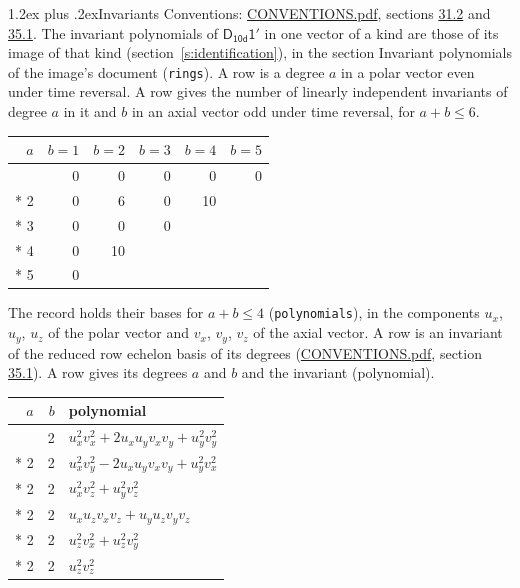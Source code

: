 \documentclass[10pt,a4paper]{article}
\makeatletter
\renewcommand\section{\@startsection{section}{1}{\z@}{-3ex plus -1ex minus -.2ex}%
  {1.2ex plus .2ex}{\normalfont\large\sffamily\bfseries\color{parttitle}}}
\numberwithin{equation}{section}
\newcommand{\grp}[1]{\mathsf{#1}}
\makeatother
\begin{document}
\section{Invariants}\label{s:invariants}
Conventions: \href{../../CONVENTIONS.pdf}{CONVENTIONS.pdf}, sections \href{../../CONVENTIONS.pdf\#conv.31.2}{31.2} and \href{../../CONVENTIONS.pdf\#conv.35.1}{35.1}.
The invariant polynomials of $\grp{D_{10d}1'}$ in one vector of a kind are those of its image of that kind (section~\ref{s:identification}), in the section Invariant polynomials of the image's document (\texttt{rings}).
\leavevmode\label{n:index.degree.polar}\label{n:index.degree.axial}A row is a degree $a$ in a polar vector even under time reversal. A row gives the number of linearly independent invariants of degree $a$ in it and $b$ in an axial vector odd under time reversal, for $a + b \le 6$.
{\small\begin{longtable}{@{}rrrrrr@{}}\toprule
$a$ & $b = 1$ & $b = 2$ & $b = 3$ & $b = 4$ & $b = 5$\\\midrule\endhead
\bottomrule\endfoot\endlastfoot
1 & 0 & 0 & 0 & 0 & 0\\*
2 & 0 & 6 & 0 & 10 & \\*
3 & 0 & 0 & 0 &  & \\*
4 & 0 & 10 &  &  & \\*
5 & 0 &  &  &  & \\
\bottomrule\end{longtable}}
\leavevmode\label{n:local.component.polar}\label{n:local.component.axial}The record holds their bases for $a + b \le 4$ (\texttt{polynomials}), in the components $u_{x}$, $u_{y}$, $u_{z}$ of the polar vector and $v_{x}$, $v_{y}$, $v_{z}$ of the axial vector. \label{n:head.polynomial}A row is an invariant of the reduced row echelon basis of its degrees (\href{../../CONVENTIONS.pdf}{CONVENTIONS.pdf}, section \href{../../CONVENTIONS.pdf\#conv.35.1}{35.1}). A row gives its degrees $a$ and $b$ and the invariant (polynomial).
{\small\renewcommand{\arraystretch}{1.2}\begin{longtable}{@{}rrl@{}}\toprule
$a$ & $b$ & polynomial\\\midrule\endhead
\bottomrule\endfoot\endlastfoot
2 & 2 & $u_{x}^{2}v_{x}^{2} + 2u_{x}u_{y}v_{x}v_{y} + u_{y}^{2}v_{y}^{2}$\\*
2 & 2 & $u_{x}^{2}v_{y}^{2} - 2u_{x}u_{y}v_{x}v_{y} + u_{y}^{2}v_{x}^{2}$\\*
2 & 2 & $u_{x}^{2}v_{z}^{2} + u_{y}^{2}v_{z}^{2}$\\*
2 & 2 & $u_{x}u_{z}v_{x}v_{z} + u_{y}u_{z}v_{y}v_{z}$\\*
2 & 2 & $u_{z}^{2}v_{x}^{2} + u_{z}^{2}v_{y}^{2}$\\*
2 & 2 & $u_{z}^{2}v_{z}^{2}$\\
\bottomrule\end{longtable}}
\end{document}
